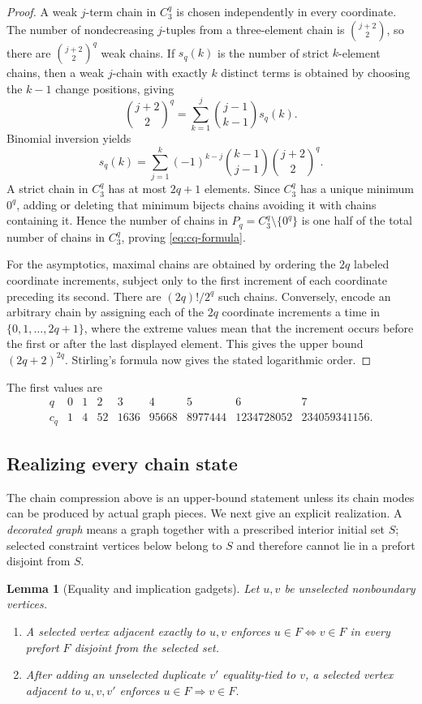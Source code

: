 \documentclass[11pt,reqno]{amsart}
\newtheorem{lemma}[lemma]{Lemma}
\theoremstyle{definition}
\begin{document}
\begin{proof}
A weak $j$-term chain in $C_3^q$ is chosen independently in every coordinate.
The number of nondecreasing $j$-tuples from a three-element chain is
$\binom{j+2}{2}$, so there are $\binom{j+2}{2}^q$ weak chains.  If $s_q(k)$ is
the number of strict $k$-element chains, then a weak $j$-chain with exactly
$k$ distinct terms is obtained by choosing the $k-1$ change positions, giving
\[
 \binom{j+2}{2}^q
 =\sum_{k=1}^j\binom{j-1}{k-1}s_q(k).
\]
Binomial inversion yields
\[
 s_q(k)=\sum_{j=1}^k(-1)^{k-j}\binom{k-1}{j-1}\binom{j+2}{2}^q.
\]
A strict chain in $C_3^q$ has at most $2q+1$ elements.  Since $C_3^q$ has a
unique minimum $0^q$, adding or deleting that minimum bijects chains avoiding
it with chains containing it.  Hence the number of chains in
$P_q=C_3^q\setminus\{0^q\}$ is one half of the total number of chains in
$C_3^q$, proving \eqref{eq:cq-formula}.

For the asymptotics, maximal chains are obtained by ordering the $2q$ labeled
coordinate increments, subject only to the first increment of each coordinate
preceding its second.  There are $(2q)!/2^q$ such chains.  Conversely, encode
an arbitrary chain by assigning each of the $2q$ coordinate increments a time
in $\{0,1,\ldots,2q+1\}$, where the extreme values mean that the increment
occurs before the first or after the last displayed element.  This gives the
upper bound $(2q+2)^{2q}$.  Stirling's formula now gives the stated logarithmic
order.
\end{proof}

The first values are
\[
\begin{array}{c|rrrrrrrr}
q&0&1&2&3&4&5&6&7\\
\hline
c_q&1&4&52&1636&95668&8977444&1234728052&234059341156.
\end{array}
\]

\subsection{Realizing every chain state}

The chain compression above is an upper-bound statement unless its chain modes
can be produced by actual graph pieces.  We next give an explicit realization.
A \emph{decorated graph} means a graph together with a prescribed interior
initial set $S$; selected constraint vertices below belong to $S$ and therefore
cannot lie in a prefort disjoint from $S$.

\begin{lemma}[Equality and implication gadgets]\label{lem:boolean-gadgets}
Let $u,v$ be unselected nonboundary vertices.
\begin{enumerate}[label=\textnormal{(\alph*)}]
\item A selected vertex adjacent exactly to $u,v$ enforces
$u\in F\Longleftrightarrow v\in F$ in every prefort $F$ disjoint from the
selected set.
\item After adding an unselected duplicate $v'$ equality-tied to $v$, a
selected vertex adjacent to $u,v,v'$ enforces
$u\in F\Longrightarrow v\in F$.
\end{enumerate}
\end{lemma}
\end{document}
